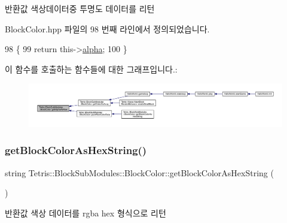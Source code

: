 \begin{DoxyReturn}{반환값}
색상데이터중 투명도 데이터를 리턴 
\end{DoxyReturn}


Block\+Color.\+hpp 파일의 98 번째 라인에서 정의되었습니다.


\begin{DoxyCode}
98                                          \{
99                 \textcolor{keywordflow}{return} this->\hyperlink{class_tetris_1_1_block_sub_modules_1_1_block_color_af0983ea684f33617a0b482cfea1d3c2b}{alpha};
100             \}
\end{DoxyCode}
이 함수를 호출하는 함수들에 대한 그래프입니다.\+:
\nopagebreak
\begin{figure}[H]
\begin{center}
\leavevmode
\includegraphics[width=350pt]{de/d44/class_tetris_1_1_block_sub_modules_1_1_block_color_acb1c9b34ee534857741025bd2824201a_icgraph}
\end{center}
\end{figure}
\mbox{\label{class_tetris_1_1_block_sub_modules_1_1_block_color_a79cc837f207645628542876997c9e919}} 
\subsubsection{\texorpdfstring{get\+Block\+Color\+As\+Hex\+String()}{getBlockColorAsHexString()}}
{\footnotesize\ttfamily string Tetris\+::\+Block\+Sub\+Modules\+::\+Block\+Color\+::get\+Block\+Color\+As\+Hex\+String (\begin{DoxyParamCaption}{ }\end{DoxyParamCaption})\hspace{0.3cm}{\ttfamily [inline]}}

\begin{DoxyReturn}{반환값}
색상 데이터를 rgba hex 형식으로 리턴 
\end{DoxyReturn}


